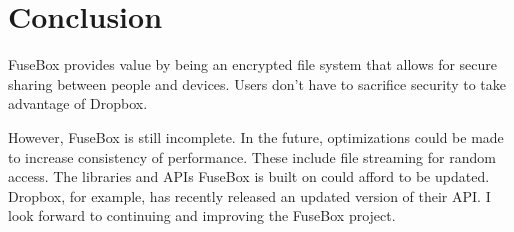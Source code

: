 \documentclass[11pt,twocolumn,letterpaper]{article}
\newcommand{\appname}{FuseBox }
\begin{document}
\section{Conclusion}
\label{sec:conclusion}
\appname provides value by being an encrypted file
system that allows for secure sharing between people and devices.
Users don't have to sacrifice security to take advantage of Dropbox. 
\par However, \appname is still incomplete. In the future, optimizations
could be made to increase consistency of performance. These include
file streaming for random access. The libraries and APIs \appname is
built on could afford to be updated. Dropbox, for example, has recently released an
updated version of their API. I look forward to continuing and
improving the \appname project.    



\end{document}
